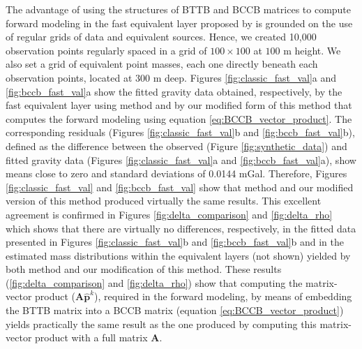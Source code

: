 \documentclass[manuscript,revised]{geophysics}
\begin{document}
The advantage of using the structures of BTTB and BCCB matrices to compute forward modeling in  the fast equivalent layer proposed by \citet{siqueira-etal2017} is grounded on the use of regular grids of data and equivalent sources. Hence, we created 10,000 observation points regularly spaced in a grid of $100 \times 100$ at $100$ m height. We also set a grid of equivalent point masses, each one directly beneath each observation points, located at $300$ m deep.  Figures \ref{fig:classic_fast_val}a and \ref{fig:bccb_fast_val}a  show the fitted gravity data obtained, respectively, by the fast equivalent layer using \citet{siqueira-etal2017} method and by our modified form of this method that computes the forward modeling using equation \ref{eq:BCCB_vector_product}. The corresponding residuals (Figures \ref{fig:classic_fast_val}b and \ref{fig:bccb_fast_val}b), defined as the difference between the observed (Figure  \ref{fig:synthetic_data}) and fitted gravity data (Figures \ref{fig:classic_fast_val}a and \ref{fig:bccb_fast_val}a), show means close to zero  and standard deviations of 0.0144 mGal.  Therefore, Figures \ref{fig:classic_fast_val} and \ref{fig:bccb_fast_val} show that \citet{siqueira-etal2017} method and our modified version of this method produced virtually the same results. This excellent agreement is confirmed in Figures \ref{fig:delta_comparison} and \ref{fig:delta_rho} which shows that there are virtually no differences, respectively,  in the fitted data presented in Figures \ref{fig:classic_fast_val}b and \ref{fig:bccb_fast_val}b and in the estimated mass distributions within the equivalent layers (not shown) yielded by both \citet{siqueira-etal2017} method and our modification of this method.  These results (\ref{fig:delta_comparison} and \ref{fig:delta_rho})  show that computing the matrix-vector product ($\mathbf{A} \hat{\mathbf{p}}^k$), required in the forward modeling, by means of embedding the BTTB matrix into a BCCB matrix (equation \ref{eq:BCCB_vector_product}) yields practically the same result as the one produced by computing this matrix-vector product  with a full matrix $\mathbf{A}$.
\end{document}
